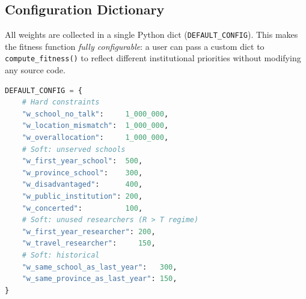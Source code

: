 \documentclass[12pt, a4paper]{article}
\begin{document}
\renewcommand{\arraystretch}{1.3}
\begin{table}[H]
  \centering
  \caption{Soft constraint penalties, their context, and default weights.}
  \label{tab:soft_penalties}
\end{table}
\renewcommand{\arraystretch}{1}

\subsection{Configuration Dictionary}

All weights are collected in a single Python dict (\texttt{DEFAULT\_CONFIG}).
This makes the fitness function \emph{fully configurable}: a user can pass a custom
dict to \texttt{compute\_fitness()} to reflect different institutional priorities without
modifying any source code.

\begin{lstlisting}[language=Python, caption={Configurable weight dictionary}]
DEFAULT_CONFIG = {
    # Hard constraints
    "w_school_no_talk":     1_000_000,
    "w_location_mismatch":  1_000_000,
    "w_overallocation":     1_000_000,
    # Soft: unserved schools
    "w_first_year_school":  500,
    "w_province_school":    300,
    "w_disadvantaged":      400,
    "w_public_institution": 200,
    "w_concerted":          100,
    # Soft: unused researchers (R > T regime)
    "w_first_year_researcher": 200,
    "w_travel_researcher":     150,
    # Soft: historical
    "w_same_school_as_last_year":   300,
    "w_same_province_as_last_year": 150,
}
\end{lstlisting}
\end{document}
